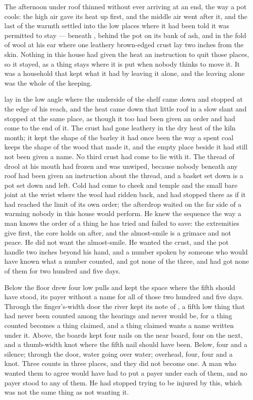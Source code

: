 The afternoon under  roof thinned without ever arriving at an end, the way a pot cools: the high air gave its heat up first, and the middle air went after it, and the last of the warmth settled into the low places where it had been told it was permitted to stay --- beneath , behind the pot on its bank of ash, and in the fold of wool at his ear where one leathery brown-edged crust lay two inches from the skin. Nothing in this house had given the heat an instruction to quit those places, so it stayed, as a thing stays where it is put when nobody thinks to move it. It was a household that kept what it had by leaving it alone, and the leaving alone was the whole of the keeping.

 lay in the low angle where the underside of the shelf came down and stopped at the edge of his reach, and the heat came down that little roof in a slow slant and stopped at the same place, as though it too had been given an order and had come to the end of it. The crust had gone leathery in the dry heat of the kiln month; it kept the shape of the barley it had once been the way a spent coal keeps the shape of the wood that made it, and the empty place beside it had still not been given a name. No third crust had come to lie with it. The thread of drool at his mouth had frozen and was unwiped, because nobody beneath any roof had been given an instruction about the thread, and a basket set down is a pot set down and left. Cold had come to cheek and temple and the small bare joint at the wrist where the wool had ridden back, and had stopped there as if it had reached the limit of its own order; the afterdrop waited on the far side of a warming nobody in this house would perform. He knew the sequence the way a man knows the order of a thing he has tried and failed to save: the extremities give first, the core holds on after, and the almost-smile is a grimace and not peace. He did not want the almost-smile. He wanted the crust, and the pot handle two inches beyond his hand, and a number spoken by someone who would have known what a number counted, and got none of the three, and had got none of them for two hundred and five days.

Below the floor  drew four low pulls and kept the space where the fifth should have stood, its payer without a name for all of those two hundred and five days. Through the finger's-width door the river kept its note of , a fifth low thing that had never been counted among the hearings and never would be, for a thing counted becomes a thing claimed, and a thing claimed wants a name written under it. Above, the boards kept four nails on the near board, four on the next, and a thumb-width knot where the fifth nail should have been. Below, four and a silence; through the door, water going over water; overhead, four, four and a knot. Three counts in three places, and they did not become one. A man who wanted them to agree would have had to put a payer under each of them, and no payer stood to any of them. He had stopped trying to be injured by this, which was not the same thing as not wanting it.

